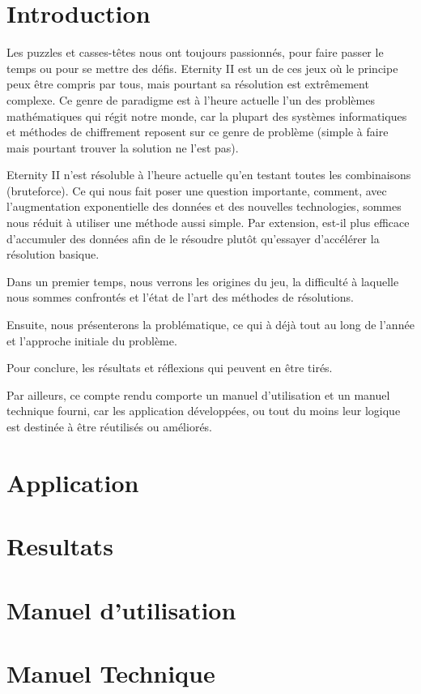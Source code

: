 \documentclass{article}
\begin{document}
	\renewcommand{\labelitemi}{$\bullet$}
	\renewcommand{\labelitemii}{$\--$}
	\renewcommand{\labelitemiii}{$\diamond$}
	\renewcommand{\labelitemiv}{$\ast$}

	\newcommand{\HRule}{\rule{\linewidth}{0.5mm}}


	

	\section{Introduction}

	Les puzzles et casses-têtes nous ont toujours passionnés, pour faire passer le temps ou pour se mettre des défis. Eternity II est un de ces jeux où le principe peux être compris par tous, mais pourtant sa résolution est extrêmement complexe. Ce genre de paradigme est à l'heure actuelle l'un des problèmes mathématiques qui régit notre monde, car la plupart des systèmes informatiques et méthodes de chiffrement reposent sur ce genre de problème (simple à faire mais pourtant trouver la solution ne l'est pas).

	Eternity II n'est résoluble à l'heure actuelle qu'en testant toutes les combinaisons (bruteforce). Ce qui nous fait poser une question importante, comment, avec l'augmentation exponentielle des données et des nouvelles technologies, sommes nous réduit à utiliser une méthode aussi simple.
	Par extension, est-il plus efficace d'accumuler des données afin de le résoudre plutôt qu'essayer d'accélérer la résolution basique.

	Dans un premier temps, nous verrons les origines du jeu, la difficulté à laquelle nous sommes confrontés et l'état de l'art des méthodes de résolutions.

	Ensuite, nous présenterons la problématique, ce qui à déjà tout au long de l'année et l'approche initiale du problème.

	Pour conclure, les résultats et réflexions qui peuvent en être tirés.

	Par ailleurs, ce compte rendu comporte un manuel d'utilisation et un manuel technique fourni, car les application développées, ou tout du moins leur logique est destinée à être réutilisés ou améliorés.


	\newpage
	

	\newpage
	

	\newpage
	

	\section{Application}

	\section{Resultats}

	\section{Manuel d'utilisation}

	\section{Manuel Technique}


	\printbibliography
\end{document}
